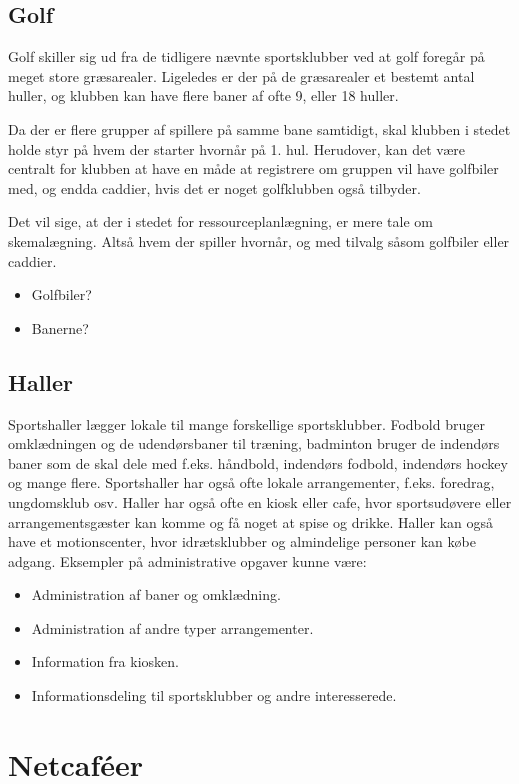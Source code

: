 \subsection{Golf}
Golf skiller sig ud fra de tidligere nævnte sportsklubber ved at golf foregår på meget store græsarealer. Ligeledes er der på de græsarealer et bestemt antal huller, og klubben kan have flere baner af ofte 9, eller 18 huller. 

Da der er flere grupper af spillere på samme bane samtidigt, skal klubben i stedet holde styr på hvem der starter hvornår på 1. hul. Herudover, kan det være centralt for klubben at have en måde at registrere om gruppen vil have golfbiler med, og endda caddier, hvis det er noget golfklubben også tilbyder.

Det vil sige, at der i stedet for ressourceplanlægning, er mere tale om skemalægning. Altså hvem der spiller hvornår, og med tilvalg såsom golfbiler eller caddier.
\begin{itemize}
\item Golfbiler?
\item Banerne?
\end{itemize}

\subsection{Haller}
Sportshaller lægger lokale til mange forskellige sportsklubber. Fodbold bruger omklædningen og de udendørsbaner til træning, badminton bruger de indendørs baner som de skal dele med f.eks. håndbold, indendørs fodbold, indendørs hockey og mange flere. Sportshaller har også ofte lokale arrangementer, f.eks. foredrag, ungdomsklub osv. 
Haller har også ofte en kiosk eller cafe, hvor sportsudøvere eller arrangementsgæster kan komme og få noget at spise og drikke. 
Haller kan også have et motionscenter, hvor idrætsklubber og almindelige personer kan købe adgang. 
Eksempler på administrative opgaver kunne være:
\begin{itemize}
\item Administration af baner og omklædning.
\item Administration af andre typer arrangementer.
\item Information fra kiosken.
\item Informationsdeling til sportsklubber og andre interesserede.
\end{itemize}

\section{Netcaféer}\label{chap:netcafeer}

